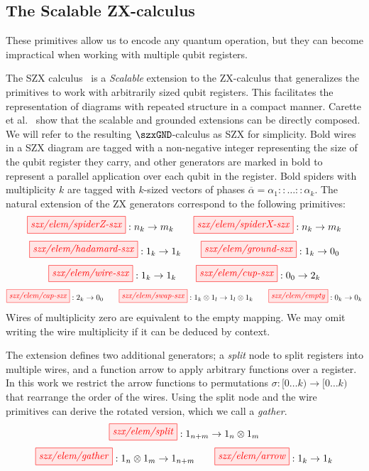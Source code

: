 \subsection{The Scalable ZX-calculus}%
\label{sec:szx}
These primitives allow us to encode any quantum operation,
but they can become impractical when working with multiple qubit registers.

The SZX calculus~\cite{carette_szx-calculus_2019,carette_quantum_2021}
is a \textit{Scalable} extension to the ZX-calculus
that generalizes the primitives to work with arbitrarily sized qubit registers.
This facilitates the representation of diagrams with repeated structure
in a compact manner. 
Carette et al.~\cite{carette_quantum_2021} show that the scalable and grounded extensions
can be directly composed.
We will refer to the resulting $\szxGND$-calculus as SZX for simplicity.
%
Bold wires in a SZX diagram are tagged with a non-negative integer representing
the size of the qubit register they carry, and other generators are marked in bold 
to represent a parallel application over each qubit in the register.
Bold spiders with multiplicity $k$ are tagged with $k$-sized vectors of phases
$\overline\alpha = \alpha_1 :: \dots :: \alpha_k$.
The natural extension of the ZX generators correspond to the following primitives:
\[
    \tikzfig{szx/elem/spiderZ-szx} : n_k \to m_k
    \qquad
    \tikzfig{szx/elem/spiderX-szx} : n_k \to m_k
\]
\[
    \tikzfig{szx/elem/hadamard-szx} : 1_k \to 1_k
    \qquad
    \tikzfig{szx/elem/ground-szx} : 1_k \to 0_0
\]
\[
    \tikzfig{szx/elem/wire-szx} : 1_k \to 1_k
    \qquad
    \tikzfig{szx/elem/cup-szx} : 0_0 \to 2_k
\]
\[
    \tikzfig{szx/elem/cap-szx} : 2_k \to 0_0
    \qquad
    \tikzfig{szx/elem/swap-szx} : 1_k \otimes 1_l \to 1_l \otimes 1_k
    \qquad
    \tikzfig{szx/elem/empty} : 0_k \to 0_k
\]
Wires of multiplicity zero are equivalent to the empty mapping.
We may omit writing the wire multiplicity if it can be deduced by context. 

The extension defines two additional generators; a \textit{split} node to split
registers into multiple wires, and a function arrow to apply arbitrary functions
over a register. In this work we restrict the arrow functions to permutations
$\sigma : [0 \dots k) \to [0 \dots k)$ that rearrange the order of the wires.
Using the split node and the wire primitives can derive the rotated version,
which we call a \textit{gather}.
\[
    \tikzfig{szx/elem/split} : 1_{n+m} \to 1_n \otimes 1_m
\]
\[
    \tikzfig{szx/elem/gather} : 1_n \otimes 1_m \to 1_{n+m}
    \qquad
    \tikzfig{szx/elem/arrow} : 1_k \to 1_k
\]

